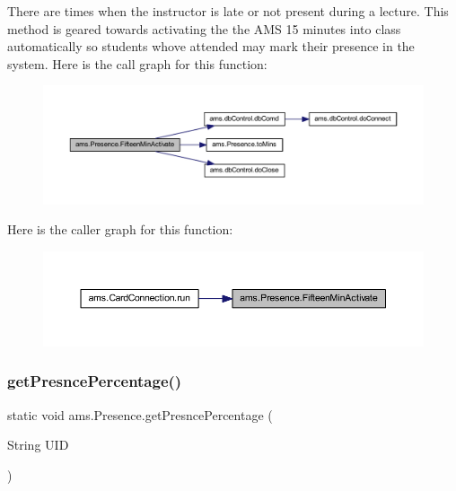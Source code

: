 There are times when the instructor is late or not present during a lecture. This method is geared towards activating the the A\+MS 15 minutes into class automatically so students who\textquotesingle{}ve attended may mark their presence in the system. Here is the call graph for this function\+:\nopagebreak
\begin{figure}[H]
\begin{center}
\leavevmode
\includegraphics[width=350pt]{classams_1_1_presence_a84efc9c047a0a2259f61cf55356c9701_cgraph}
\end{center}
\end{figure}
Here is the caller graph for this function\+:\nopagebreak
\begin{figure}[H]
\begin{center}
\leavevmode
\includegraphics[width=350pt]{classams_1_1_presence_a84efc9c047a0a2259f61cf55356c9701_icgraph}
\end{center}
\end{figure}
\mbox{\label{classams_1_1_presence_af8a73a088625da3be87b17190563fd81}} 
\subsubsection{\texorpdfstring{getPresncePercentage()}{getPresncePercentage()}}
{\footnotesize\ttfamily static void ams.\+Presence.\+get\+Presnce\+Percentage (\begin{DoxyParamCaption}\item[{String}]{U\+ID }\end{DoxyParamCaption})\hspace{0.3cm}{\ttfamily [static]}}

